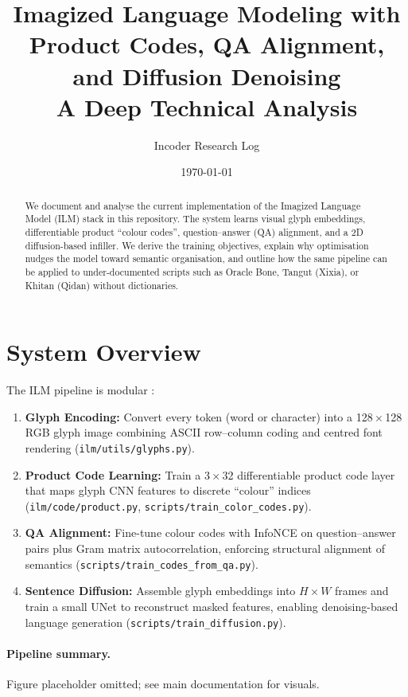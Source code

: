 \documentclass[11pt]{article}
\title{Imagized Language Modeling with Product Codes, QA Alignment, and Diffusion Denoising\\A Deep Technical Analysis}
\author{Incoder Research Log}
\date{\today}
\begin{document}
\maketitle

\begin{abstract}
We document and analyse the current implementation of the Imagized Language Model (ILM) stack in this repository. The system learns visual glyph embeddings, differentiable product ``colour codes'', question--answer (QA) alignment, and a 2D diffusion-based infiller. We derive the training objectives, explain why optimisation nudges the model toward semantic organisation, and outline how the same pipeline can be applied to under-documented scripts such as Oracle Bone, Tangut (Xixia), or Khitan (Qidan) without dictionaries.
\end{abstract}

\section{System Overview}
The ILM pipeline is modular :
\begin{enumerate}
    \item \textbf{Glyph Encoding:} Convert every token (word or character) into a 128\,$\times$\,128 RGB glyph image combining ASCII row--column coding and centred font rendering (\texttt{ilm/utils/glyphs.py}).
    \item \textbf{Product Code Learning:} Train a 3\,$\times$\,32 differentiable product code layer that maps glyph CNN features to discrete ``colour'' indices (\texttt{ilm/code/product.py}, \texttt{scripts/train\_color\_codes.py}).
    \item \textbf{QA Alignment:} Fine-tune colour codes with InfoNCE on question--answer pairs plus Gram matrix autocorrelation, enforcing structural alignment of semantics (\texttt{scripts/train\_codes\_from\_qa.py}).
    \item \textbf{Sentence Diffusion:} Assemble glyph embeddings into $H\times W$ frames and train a small UNet to reconstruct masked features, enabling denoising-based language generation (\texttt{scripts/train\_diffusion.py}).
\end{enumerate}

\paragraph{Pipeline summary.} Figure placeholder omitted; see main documentation for visuals.
\end{document}
